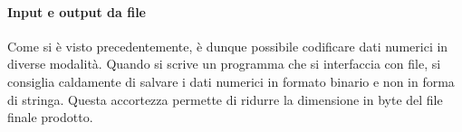 \paragraph*{Input e output da file}
Come si è visto precedentemente, è dunque possibile codificare dati numerici in diverse modalità. Quando si scrive un programma che si interfaccia con file, si consiglia caldamente di salvare i dati numerici in formato binario e non in forma di stringa. Questa accortezza permette di ridurre la dimensione in byte del file finale prodotto.


